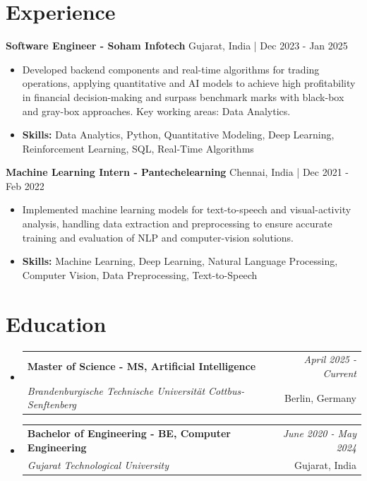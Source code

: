 \documentclass[a4paper,11pt]{article}
\makeatletter
\newcommand{\resumeSubheading}[4]{
\vspace{0.5mm}\item
    \begin{tabular*}{\linewidth}[t]{l@{\extracolsep{\fill}}r}
        \textbf{#1} & \textit{\footnotesize{#4}} \\
        \textit{\footnotesize{#3}} &  \footnotesize{#2}\\
    \end{tabular*}
    \vspace{-2.4mm}
}
\makeatother
\begin{document}
\section{\textbf{Experience}}


\vspace{1mm}
  \textbf{Software Engineer - Soham Infotech} \hfill Gujarat, India | Dec 2023 - Jan 2025
\vspace{-1.5mm} %
\begin{itemize}
  \item Developed backend components and real-time algorithms for trading operations, applying quantitative and AI models to achieve high profitability in financial decision-making and surpass benchmark marks with black-box and gray-box approaches. Key working areas: Data Analytics.

\vspace{-2mm}
  \item \textbf{Skills:} Data Analytics, Python, Quantitative Modeling, Deep Learning, Reinforcement Learning, SQL, Real-Time Algorithms
\end{itemize}

\vspace{1mm}
  \textbf{Machine Learning Intern - Pantechelearning} \hfill Chennai, India | Dec 2021 - Feb 2022
\vspace{-1.5mm} %
\begin{itemize}
  \item Implemented machine learning models for text-to-speech and visual-activity analysis, handling data extraction and preprocessing to ensure accurate training and evaluation of NLP and computer-vision solutions.
\vspace{-2mm}
  \item \textbf{Skills:} Machine Learning, Deep Learning, Natural Language Processing, Computer Vision, Data Preprocessing, Text-to-Speech
\end{itemize}\section{\textbf{Education}}
\vspace{-0.4mm}

\begin{itemize}[leftmargin=0.15in, label={}]
\resumeSubheading
{Master of Science - MS, Artificial Intelligence }{Berlin, Germany}
{Brandenburgische Technische Universität Cottbus-Senftenberg  }{April 2025 - Current}

\vspace{1.0mm} %
\resumeSubheading
{Bachelor of Engineering - BE, Computer Engineering  }{Gujarat, India}
{Gujarat Technological University }{June 2020 - May 2024}

\end{itemize}
\end{document}

